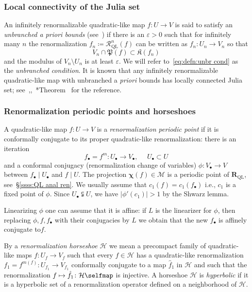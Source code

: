 \documentclass{amsart}
\renewcommand{\sp}{{\ \ }}
\newcommand{\1}{{\mathbb 1 }}
\newcommand{\Mandel}{{\mathcal{M}}}
\newcommand\Hors{{\mathcal H}}
\newcommand\RR{\mathcal{R}}
\newcommand\mRR{\boldsymbol R}%
\newcommand\Kfilled{{\mathfrak K}}
\newcommand\Post{{\mathfrak P}}
\theoremstyle{remark}
\numberwithin{equation}{section}
\theoremstyle{definition}
\def\QL{{\text{QL}}}
\newcommand{\bchi}{{\boldsymbol{ \chi}}}
\newcommand{\RN}[1]{\MakeUppercase{\romannumeral#1}}%
\theoremstyle{nonumberbreak}
\begin{document}
\subsubsection{Local connectivity of the Julia set}
\label{sss:JLC}
An infinitely renormalizable quadratic-like map $f\colon U\to V$ is said to satisfy an \emph{unbranched a priori bounds} (see~\cite{McM2}) if there is an $\varepsilon>0$ such that for infinitely many $n$ the renormalization $f_n\coloneqq \RR^n_\QL (f)$ can be written as $f_n\colon U_n\to V_n$ so that 
\begin{equation}
\label{eq:defn:unbr cond}
V_n\cap \Post (f)\subset \Kfilled(f_n)
\end{equation}
 and the modulus of $V_n\setminus U_n$ is at least $\varepsilon$. We will refer to~\eqref{eq:defn:unbr cond} as the \emph{unbranched condition}. It is known that any infinitely renormalizable quadratic-like map with unbranched a \emph{priori} bounds has locally connected Julia set; see~\cite{J},\cite{McM2},~\cite{L:acta}*{Theorem~\RN{6}} for the reference. 


\subsubsection{Renormalization periodic points and horseshoes} \label{sss:renorm horsh}A quadratic-like map $f\colon U\to V$ is a \emph{renormalization periodic point} if it is conformally conjugate to its proper quadratic-like renormalization: there is an iteration 
\[ f_\bullet =f^m\colon U_\bullet \to V_\bullet, \sp\sp\sp U_\bullet \subset U\]
and a conformal conjugacy (renormalization change of variables) $\phi\colon V_\bullet\to V$ between $f_\bullet \mid U_\bullet$ and $f\mid U$. The projection $\bchi(f)\in \Mandel$ is a periodic point of $\mRR_\QL$, see~\S\ref{ssss:QL anal ren}. We usually assume that $c_1(f)=c_1(f_\bullet)$ i.e., $c_1$ is a fixed point of $\phi$. Since $U_\bullet\subsetneqq U$, we have $|\phi'(c_1)|>1$ by the Shwarz lemma.

Linearizing $\phi$ one can assume that it is affine: if $L$ is the linearizer for $\phi$, then replacing $\phi,f,f_\bullet$ with their conjugacies by $L$ we obtain that the new $f_\bullet$ is affinely conjugate to$f$.


By a \emph{renormalization horseshoe} $\Hors$ we mean a precompact family of quadratic-like maps $f\colon U_f \to V_f$ such that every $f\in \Hors$ has a quadratic-like renormalization $f_1 =f ^{m(f)}\colon U_{f_1} \to V_{f_1}$ conformally conjugate to a map $\hat f_1$ in $\Hors$ and such that the renormalization $f\mapsto \hat f_1\colon \Hors\selfmap$ is injective. A horseshoe $\Hors$ is \emph{hyperbolic} if it is a hyperbolic set of a renormalization operator defined on a neighborhood of $\Hors$.
 
\end{document}
